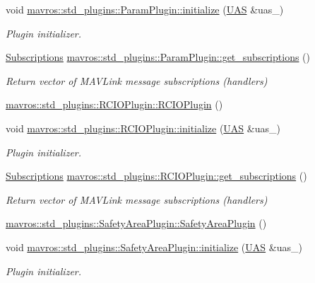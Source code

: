 \begin{DoxyCompactItemize}
\item 
void \mbox{\hyperlink{group__plugin_gad1185b49c13a316fd54ef08895ac012e}{mavros\+::std\+\_\+plugins\+::\+Param\+Plugin\+::initialize}} (\mbox{\hyperlink{classmavros_1_1UAS}{U\+AS}} \&uas\+\_\+)
\begin{DoxyCompactList}\small\item\em Plugin initializer. \end{DoxyCompactList}\item 
\mbox{\hyperlink{group__plugin_ga8967d61fc77040e0c3ea5a4585d62a09}{Subscriptions}} \mbox{\hyperlink{group__plugin_gac1471c7f06987a6ca0b199634a80f22b}{mavros\+::std\+\_\+plugins\+::\+Param\+Plugin\+::get\+\_\+subscriptions}} ()
\begin{DoxyCompactList}\small\item\em Return vector of M\+A\+V\+Link message subscriptions (handlers) \end{DoxyCompactList}\item 
\mbox{\hyperlink{group__plugin_gaabbdf318dd1876ca9ed7c2d09ced9c4e}{mavros\+::std\+\_\+plugins\+::\+R\+C\+I\+O\+Plugin\+::\+R\+C\+I\+O\+Plugin}} ()
\item 
void \mbox{\hyperlink{group__plugin_ga96ac58aa9a228dc59d676fdde7909bf5}{mavros\+::std\+\_\+plugins\+::\+R\+C\+I\+O\+Plugin\+::initialize}} (\mbox{\hyperlink{classmavros_1_1UAS}{U\+AS}} \&uas\+\_\+)
\begin{DoxyCompactList}\small\item\em Plugin initializer. \end{DoxyCompactList}\item 
\mbox{\hyperlink{group__plugin_ga8967d61fc77040e0c3ea5a4585d62a09}{Subscriptions}} \mbox{\hyperlink{group__plugin_gafd86a5abaa163c230462ad68151abdff}{mavros\+::std\+\_\+plugins\+::\+R\+C\+I\+O\+Plugin\+::get\+\_\+subscriptions}} ()
\begin{DoxyCompactList}\small\item\em Return vector of M\+A\+V\+Link message subscriptions (handlers) \end{DoxyCompactList}\item 
\mbox{\hyperlink{group__plugin_gacb880f22401f4f72c4a96e421e363b1a}{mavros\+::std\+\_\+plugins\+::\+Safety\+Area\+Plugin\+::\+Safety\+Area\+Plugin}} ()
\item 
void \mbox{\hyperlink{group__plugin_gae1ffa70f4b88baa719fdcc22b7b739b6}{mavros\+::std\+\_\+plugins\+::\+Safety\+Area\+Plugin\+::initialize}} (\mbox{\hyperlink{classmavros_1_1UAS}{U\+AS}} \&uas\+\_\+)
\begin{DoxyCompactList}\small\item\em Plugin initializer. \end{DoxyCompactList}\item 

\end{DoxyCompactItemize}
